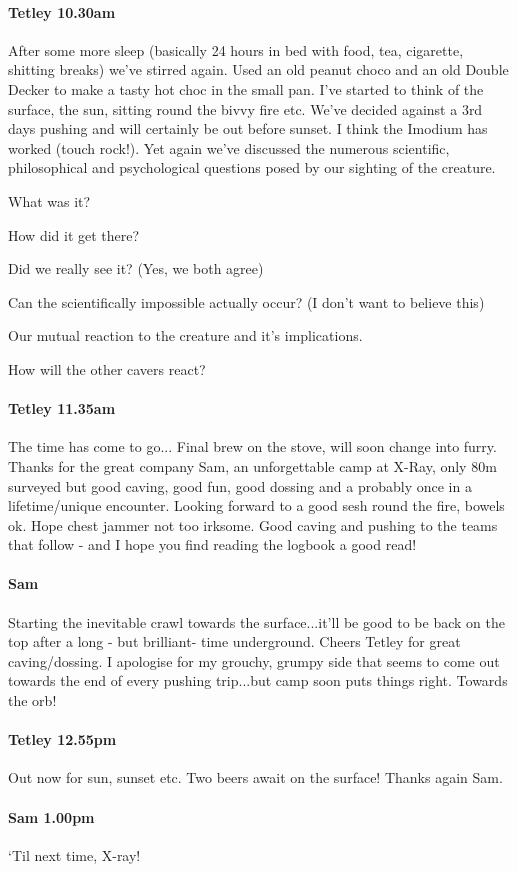 \paragraph{Tetley 10.30am}
After some more sleep (basically 24 hours in bed with food, tea, cigarette, shitting breaks) we’ve stirred again. Used an old peanut choco and an old Double Decker to make a tasty hot choc in the small pan. I’ve started to think of the surface, the sun, sitting round the bivvy fire etc. We’ve decided against a 3rd days pushing and will certainly be out before sunset. I think the Imodium has worked (touch rock!).
Yet again we’ve discussed the numerous scientific, philosophical and psychological questions posed by our sighting of the creature. 
\begin{citemize}
\item What was it?
\item How did it get there?
\item Did we really see it? (Yes, we both agree)
\item Can the scientifically impossible actually occur? (I don’t want to believe this)
\item Our mutual reaction to the creature and it’s implications.
\item How will the other cavers react?
\end{citemize}


\paragraph{Tetley 11.35am}
The time has come to go...
Final brew on the stove, will soon change into furry. Thanks for the great company Sam, an unforgettable camp at X-Ray, only 80m surveyed but good caving, good fun, good dossing and a probably once in a lifetime/unique encounter.
Looking forward to a good sesh round the fire, bowels ok. Hope chest jammer not too irksome.
Good caving and pushing to the teams that follow - and I hope you find reading the logbook a good read!


\paragraph{Sam}
Starting the inevitable crawl towards the surface...it’ll be good to be back on the top after a long - but brilliant- time underground. Cheers Tetley for great caving/dossing. I apologise for my grouchy, grumpy side that seems to come out towards the end of every pushing trip...but camp soon puts things right. Towards the orb!


\paragraph{Tetley 12.55pm}
Out now for sun, sunset etc. Two beers await on the surface! Thanks again Sam.


\paragraph{Sam 1.00pm}
‘Til next time, X-ray!


